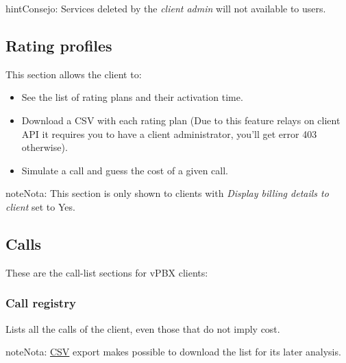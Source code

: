 \documentclass[letterpaper,10pt,spanish]{sphinxmanual}
\begin{document}
\begin{notice}{hint}{Consejo:}
Services deleted by the \emph{client admin} will not available to users.
\end{notice}


\subsection{Rating profiles}
\label{administration_portal/client/vpbx/rating_profiles:rating-profiles}\label{administration_portal/client/vpbx/rating_profiles::doc}
This section allows the client to:
\begin{itemize}
\item {} 
See the list of rating plans and their activation time.

\item {} 
Download a CSV with each rating plan (Due to this feature relays on client API it requires you to have a client administrator, you'll get error 403 otherwise).

\item {} 
Simulate a call and guess the cost of a given call.

\end{itemize}

\begin{notice}{note}{Nota:}
This section is only shown to clients with \emph{Display billing details to client} set to Yes.
\end{notice}


\subsection{Calls}
\label{administration_portal/client/vpbx/calls/index::doc}\label{administration_portal/client/vpbx/calls/index:calls}
These are the call-list sections for vPBX clients:


\subsubsection{Call registry}
\label{administration_portal/client/vpbx/calls/call_registry::doc}\label{administration_portal/client/vpbx/calls/call_registry:call-registry}\label{administration_portal/client/vpbx/calls/call_registry:id1}
Lists all the calls of the client, even those that do not imply cost.

\begin{notice}{note}{Nota:}
\href{https://es.wikipedia.org/wiki/CSV}{CSV} export makes possible to
download the list for its later analysis.
\end{notice}
\end{document}
